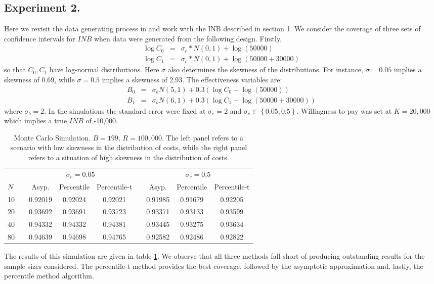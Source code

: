 \documentclass[english, 11pt,a4paper, ]{article}
\begin{document}
\subsection{Experiment 2.}
Here we revisit the data generating process in \cite{NixonWonderlingGrieve2010HealthEconomics} and work with the INB described in section 1.
We consider the coverage of three sets of confidence intervals for $ INB $ when data were generated from the following design. Firstly,
\begin{eqnarray}
\log C_0 &=& \sigma_c* N(0,1)+\log(50000) \\
\log C_1 &=& \sigma_c* N(0,1)+\log(50000+30000)
\end{eqnarray}
so that $ C_0, C_1 $ have log-normal distributions. Here $ \sigma $ also determines the skewness of the distributions. For instance, $ \sigma =0.05 $ implies a skewness of 0.69, while $ \sigma = 0.5 $ implies a skewness of 2.93. The effectiveness variables are:
\begin{eqnarray}
B_0 &=& \sigma_b N(5,1)+ 0.3(\log C_0 -\log(50000)) \\
B_1 &=& \sigma_b N(6,1)+ 0.3(\log C_1 -\log(50000+30000))
\end{eqnarray}
where $ \sigma_b =2 $. In the simulations the standard error were fixed at $\sigma_e=2  $ and $ \sigma_c\in\left\{0.05, 0.5\right\} $.
Willingness to pay was set at $ K=20,000 $ which implies a true $ INB $ of -10,000.

\begin{table}
	\scriptsize
	\centering\medskip
	\begin{tabular}{lcccccccc}
		
		&&\multicolumn{3}{c}{$ \sigma_c=0.05 $}&&\multicolumn{3}{c}{$ \sigma_c=0.5 $}\\
		$ N $&& Asyp. &Percentile& Percentile-t&& Asyp. &Percentile& Percentile-t\\
		\cline{3-5} \cline{7-9}
		10&&0.92019&0.92024  &0.92021 &&0.91985&0.91679&0.92205\\
		20&&0.93692&0.93691  &0.93723 &&0.93371&0.93133&0.93599\\
		40&&0.94332&0.94332      &0.94381 &&0.93445&0.93275&0.93634\\
		80&&0.94639& 0.94698      &0.94765 &&0.92582&0.92486&0.92822\\
	\end{tabular}
	\caption{\label{table_montecarlo_2}  Monte Carlo Simulation. $ B=199 $, $ R=100,000 $. The left panel refers to a scenario with low skewness in the distribution of costs, while the right panel refers to a situation of high skewness in the distribution of costs. }
\end{table}
The results of this simulation are given in table \ref{table_montecarlo_2}. We observe that all three methods fall short of producing outstanding results for the sample sizes considered.
The percentile-t method provides the best coverage, followed by the asymptotic approximation and, lastly, the percentile method algorithm.  
\end{document}
